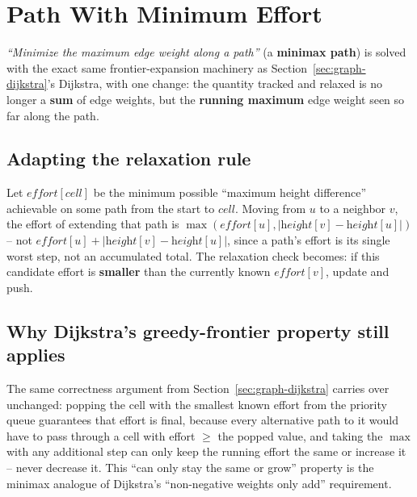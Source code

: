 \section{Path With Minimum Effort}
\label{sec:graph-path-min-effort}


\begin{patternbox}
\emph{``Minimize the maximum edge weight along a path''} (a
\textbf{minimax path}) is solved with the exact same frontier-expansion
machinery as Section~\ref{sec:graph-dijkstra}'s Dijkstra, with one
change: the quantity tracked and relaxed is no longer a
\textbf{sum} of edge weights, but the \textbf{running maximum} edge
weight seen so far along the path.
\end{patternbox}

\subsection*{Adapting the relaxation rule}

Let $\textit{effort}[\textit{cell}]$ be the minimum possible
``maximum height difference'' achievable on some path from the start
to $\textit{cell}$. Moving from $u$ to a neighbor $v$, the effort of
extending that path is $\max(\textit{effort}[u],
|\textit{height}[v]-\textit{height}[u]|)$ -- not
$\textit{effort}[u] + |\textit{height}[v]-\textit{height}[u]|$, since a
path's effort is its single worst step, not an accumulated total. The
relaxation check becomes: if this candidate effort is
\textbf{smaller} than the currently known $\textit{effort}[v]$, update
and push.

\subsection*{Why Dijkstra's greedy-frontier property still applies}

The same correctness argument from Section~\ref{sec:graph-dijkstra}
carries over unchanged: popping the cell with the smallest known
effort from the priority queue guarantees that effort is final,
because every alternative path to it would have to pass through a
cell with effort $\ge$ the popped value, and taking the
$\max$ with any additional step can only keep the running effort the
same or increase it -- never decrease it. This ``can only stay the
same or grow'' property is the minimax analogue of Dijkstra's
``non-negative weights only add'' requirement.

